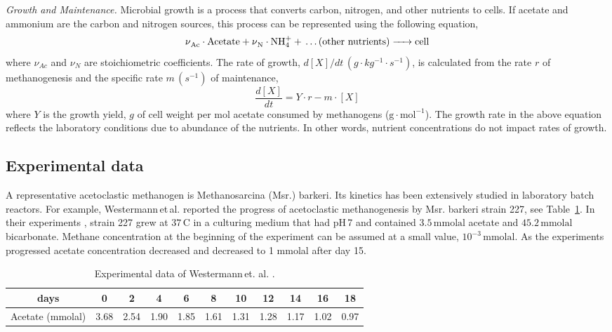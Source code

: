 \documentclass[a4paper, 12pt]{article}
\begin{document}
\medskip

{\it Growth and Maintenance.} Microbial growth is a process that converts carbon, nitrogen, and other nutrients to cells. If acetate and ammonium are the carbon and nitrogen sources, this process can be represented
using the following equation,
\[
\ce{\nu_{Ac}\cdot Acetate + \nu_{N}\cdot NH^{+}_{4} + \ldots (\text{other nutrients}) -> cell}
\]
where $\nu_{Ac}$ and $\nu_{N}$ are stoichiometric coefficients. The rate of growth, $d[X]/dt\, (g\cdot kg^{-1}\cdot s^{-1})$, is calculated from the rate $r$ of methanogenesis and the specific rate $m\,(s^{-1})$ of maintenance,
\[
\frac{d[X]}{dt}=Y\cdot r -m\cdot [X]
\]
where $Y$ is the growth yield, $g$ of cell weight per mol acetate consumed by methanogens ($\mathrm{g\cdot mol^{-1}}$). The growth rate in the above equation  reflects the laboratory conditions due to abundance of the nutrients. In other words, nutrient concentrations do not impact rates of growth.



\subsection{Experimental data}
A representative acetoclastic methanogen is Methanosarcina (Msr.) barkeri. Its kinetics has been extensively studied in laboratory batch reactors. For example, Westermann\,et\,al. \cite{Westermann1989} reported the progress of acetoclastic methanogenesis by Msr. barkeri strain 227, see Table~\ref{Tab:data}.  In their experiments , strain 227 grew at $37\, \mathrm{C}$ in a culturing medium that had pH\,7 and contained $3.5\,\mathrm{mmolal}$ acetate and $45.2\,\mathrm{mmolal}$ bicarbonate. Methane concentration at the beginning of the experiment can be assumed at a small value, $10^{-3}\,\mathrm{mmolal}$. As the experiments progressed  acetate concentration decreased and decreased to 1 mmolal after day 15. 

\begin{table}[h!]
{
\centering
\begin{tabular}{c|cccccccccc}
days &0&2&4&6&8&10&12&14&16&18\\\hline
Acetate (mmolal) &3.68 & 2.54 & 1.90 & 1.85 & 1.61 & 1.31 & 1.28 & 1.17 & 1.02 & 0.97
\end{tabular}
}
\caption{Experimental data of Westermann\,et. al. \cite{Westermann1989}.}\label{Tab:data}
\end{table}
\end{document}
